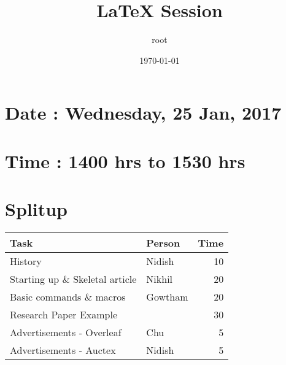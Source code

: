 \documentclass[11pt]{article}
\author{root}
\date{\today}
\title{\LaTeX{} Session}
\begin{document}
\maketitle
\tableofcontents


\section{Date : Wednesday, 25 Jan, 2017}
\label{sec:org55a3fdd}
\section{Time : 1400 hrs to 1530 hrs}
\label{sec:orge40bcb3}

\section{Splitup}
\label{sec:org11aedf1}
\begin{center}
\begin{tabular}{llr}
\hline
Task & Person & Time\\
\hline
History & Nidish & 10\\
Starting up \& Skeletal article & Nikhil & 20\\
Basic commands \& macros & Gowtham & 20\\
Research Paper Example &  & 30\\
Advertisements - Overleaf & Chu & 5\\
Advertisements - Auctex & Nidish & 5\\
\hline
\end{tabular}
\end{center}
\end{document}
